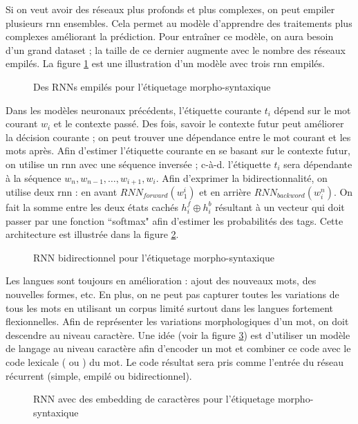 \documentclass{KodeBook}
\begin{document}
Si on veut avoir des réseaux plus profonds et plus complexes, on peut empiler plusieurs \ac{rnn} ensembles. 
Cela permet au modèle d'apprendre des traitements plus complexes améliorant la prédiction.
Pour entraîner ce modèle, on aura besoin d'un grand dataset ; la taille de ce dernier augmente avec le nombre des réseaux empilés.
La figure \ref{fig:pos-rnn2} est une illustration d'un modèle avec trois \ac{rnn} empilés.
\begin{figure}[ht]
	\centering
	\caption[Des RNNs empilés pour l'étiquetage morpho-syntaxique]{Des RNNs empilés pour l'étiquetage morpho-syntaxique \cite{2019-jurafsky-martin}\label{fig:pos-rnn2}}
\end{figure}

Dans les modèles neuronaux précédents, l'étiquette courante $t_i$ dépend sur le mot courant $w_i$ et le contexte passé. 
Des fois, savoir le contexte futur peut améliorer la décision courante ; on peut trouver une dépendance entre le mot courant et les mots après. 
Afin d'estimer l'étiquette courante en se basant sur le contexte futur, on utilise un \ac{rnn} avec une séquence inversée ; c-à-d. l'étiquette $t_i$ sera dépendante à la séquence $w_n, w_{n-1}, \ldots, w_{i+1}, w_{i}$. 
Afin d'exprimer la bidirectionnalité, on utilise deux \ac{rnn} : en avant $RNN_{forward}(w_1^i)$ et en arrière $RNN_{backword}(w_i^n)$. 
On fait la somme entre les deux états cachés $h_i^f \oplus h_i^b$ résultant à un vecteur qui doit passer par une fonction ``softmax" afin d'estimer les probabilités des tags. 
Cette architecture est illustrée dans la figure \ref{fig:pos-rnn3}.
\begin{figure}[ht]
	\centering
	\caption[RNN bidirectionnel pour l'étiquetage morpho-syntaxique]{RNN bidirectionnel pour l'étiquetage morpho-syntaxique \cite{2019-jurafsky-martin}\label{fig:pos-rnn3}}
\end{figure}

Les langues sont toujours en amélioration : ajout des nouveaux mots, des nouvelles formes, etc. 
En plus, on ne peut pas capturer toutes les variations de tous les mots en utilisant un corpus limité surtout dans les langues fortement flexionnelles. 
Afin de représenter les variations morphologiques d'un mot, on doit descendre au niveau caractère.
Une idée (voir la figure \ref{fig:pos-rnn4}) est d'utiliser un modèle de langage au niveau caractère afin d'encoder un mot et combiner ce code avec le code lexicale ( ou ) du mot. 
Le code résultat sera pris comme l'entrée du réseau récurrent (simple, empilé ou bidirectionnel).
\begin{figure}[ht]
	\centering
	\caption[Embedding de caractères pour l'étiquetage morpho-syntaxique]{RNN avec des embedding de caractères pour l'étiquetage morpho-syntaxique \cite{2019-jurafsky-martin}\label{fig:pos-rnn4}}
\end{figure}
\end{document}
